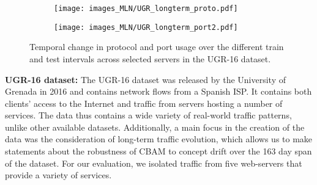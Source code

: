 \begin{figure}[ht]
\centering
\vspace{-0.2cm}
    \begin{subfigure}[b]{0.3\textwidth}
        \texttt{[image: images\_MLN/UGR\_longterm\_proto.pdf]}
        \vspace{-0.15cm}
    \end{subfigure}
    \begin{subfigure}[b]{0.3\textwidth}
        \texttt{[image: images\_MLN/UGR\_longterm\_port2.pdf]}
    \end{subfigure}
\caption{Temporal change in protocol and port usage over the different train and test intervals across selected servers in the UGR-16 dataset.}
\label{fig:longterm_analysis}
\end{figure}

\textbf{UGR-16 dataset:}
The UGR-16 dataset \cite{macia2018ugr} was released by the University of Grenada in 2016 and contains network flows from a Spanish ISP. It contains both clients' access to the Internet and traffic from servers hosting a number of services. The data thus contains a wide variety of real-world traffic patterns, unlike other available datasets. %
Additionally, a main focus in the creation of the data was the consideration of long-term traffic evolution, which allows us to make statements about the robustness of CBAM to concept drift over the 163 day span of the dataset. For our evaluation, we isolated traffic from five web-servers that provide a variety of services.


